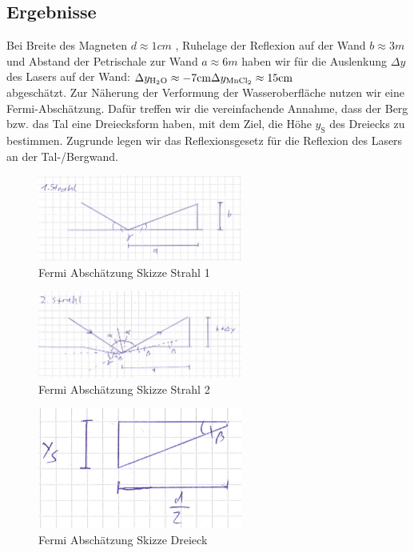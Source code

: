 \documentclass[
	a4paper,
	12pt,
	pagesize,
	ngerman
]{scrartcl}
\begin{document}
	\subsection{Ergebnisse}
	Bei Breite des Magneten $d \approx 1 \si{cm}$ , Ruhelage der Reflexion auf der Wand $b \approx 3 \si{m}$ und Abstand der Petrischale zur Wand $a \approx 6 \si{m}$ haben wir für die Auslenkung $\Delta y$ des Lasers auf der Wand: \newline
	$ \Delta y_\text{\ce{H2O}} \approx -7 \si{cm} \\
	\Delta y_\text{\ce{MnCl2}} \approx 15 \si{cm}$\\
	abgeschätzt.
	Zur Näherung der Verformung der Wasseroberfläche nutzen wir eine Fermi-Abschätzung. Dafür treffen wir die vereinfachende Annahme, dass der Berg bzw. das Tal eine Dreiecksform haben, mit dem Ziel, die Höhe $y_\text{S}$ des Dreiecks zu bestimmen. Zugrunde legen wir das Reflexionsgesetz für die Reflexion des Lasers an der Tal-/Bergwand.\\
	\begin{figure}[htb]
	  \centering
	    \includegraphics[width=0.6\textwidth]{Fermi1} 
	  \caption{Fermi Abschätzung Skizze Strahl 1}
	\end{figure}
		
	\begin{figure}[htb]
	  \centering
	    \includegraphics[width=0.6\textwidth]{Fermi2} 
	  \caption{Fermi Abschätzung Skizze Strahl 2}
	\end{figure}
	\begin{figure}[htb]
	  \centering
	    \includegraphics[width=0.6\textwidth]{Fermi3} 
	  \caption{Fermi Abschätzung Skizze Dreieck}
	\end{figure}
\end{document}
